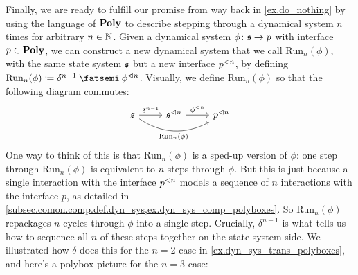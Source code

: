 \documentclass[Book-Poly]{subfiles}
\begin{document}
Finally, we are ready to fulfill our promise from way back in \cref{ex.do_nothing} by using the language of $\mathbf{Poly}$ to describe stepping through a dynamical system $n$ times for arbitrary $n\in\mathbb{N}$.
Given a dynamical system $\phi\colon\mathfrak{s}\to p$ with interface $p\in\mathbf{Poly}$, we can construct a new dynamical system that we call $\text{Run}_n(\phi)$, with the same state system $\mathfrak{s}$ but a new interface $p^{\lhd n}$, by defining $\text{Run}_n(\phi)\coloneqq\delta^{n-1}\then\phi\tripow{n}$.
Visually, we define $\text{Run}_n(\phi)$ so that the following diagram commutes:
\begin{equation}\label{eqn.speedup}
\begin{tikzcd}
	\ema{s}\ar[r, "\delta^{n-1}"]\ar[rr, bend right, "{\text{Run}_n(\phi)}"']&
	\ema{s}\tripow{n}\ar[r, "\phi\tripow{n}"]&
	p\tripow n
\end{tikzcd}
\end{equation}
One way to think of this is that $\text{Run}_n(\phi)$ is a sped-up version of $\phi$: one step through $\text{Run}_n(\phi)$ is equivalent to $n$ steps through $\phi$.
But this is just because a single interaction with the interface $p^{\lhd n}$ models a sequence of $n$ interactions with the interface $p$, as detailed in \cref{subsec.comon.comp.def.dyn_sys,ex.dyn_sys_comp_polyboxes}.
So $\text{Run}_n(\phi)$ repackages $n$ cycles through $\phi$ into a single step.
Crucially, $\delta^{n-1}$ is what tells us how to sequence all $n$ of these steps together on the state system side.
We illustrated how $\delta$ does this for the $n=2$ case in \cref{ex.dyn_sys_trans_polyboxes}, and here's a polybox picture for the $n=3$ case:
\end{document}
